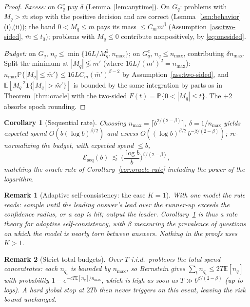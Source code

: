 \documentclass[11pt]{article}
\newtheorem{corollary}{Corollary}
\newtheorem{remark}{Remark}
\newcommand{\E}{\mathbb E}
\newcommand{\Pp}{\mathbb P}
\newcommand{\one}{\mathbf 1}
\newcommand{\nmax}{n_{\max}}
\begin{document}
\begin{proof}
\emph{Excess:} on $G_q^c$ pay $\delta$ (Lemma~\ref{lem:anytime}).  On $G_q$:
problems with $M_q>\bar m$ stop with the positive decision and are correct
(Lemma~\ref{lem:behavior}(i),(ii)); the band $0<M_q\le\bar m$ pays its mass
$\le C_m\bar m^\beta$ (Assumption~\ref{ass:two-sided}, $\bar m\le t_0$);
problems with $M_q\le0$ contribute nonpositively, by \eqref{eq:onesided}.

\emph{Budget:} on $G_q$, $n_q\le\min\{16L/M_q^2,\nmax\}$; on $G_q^c$,
$n_q\le\nmax$, contributing $\delta\nmax$.  Split the minimum at
$|M_q|\lessgtr\bar m'$ (where $16L/(\bar m')^2=\nmax$):
$\nmax\Pp\{|M_q|\le\bar m'\}\le16LC_m(\bar m')^{\beta-2}$ by
Assumption~\ref{ass:two-sided}, and
$\E[M_q^{-2}\one\{|M_q|>\bar m'\}]$ is bounded by the same integration by
parts as in Theorem~\ref{thm:oracle} with the two-sided
$F(t)=\Pp\{0<|M_q|\le t\}$.  The $+2$ absorbs epoch rounding.
\end{proof}

\begin{corollary}[Sequential rate]
\label{cor:seq-rate}
Choosing $\nmax=\lceil b^{2/(2-\beta)}\rceil$, $\delta=1/\nmax$ yields
expected spend $O(b(\log b)^{\beta/2})$ and excess
$O((\log b)^{\beta/2}\,b^{-\beta/(2-\beta)})$; re-normalizing the budget,
with expected spend $\le b$,
\[
\mathcal E_{\mathrm{seq}}(b)
\ \lesssim\
\Big(\frac{\log b}{b}\Big)^{\beta/(2-\beta)},
\]
matching the oracle rate of Corollary~\ref{cor:oracle-rate} including the
power of the logarithm.
\end{corollary}

\begin{remark}[Adaptive self-consistency: the case $K=1$]
\label{rem:selfconsistency}
With one model the rule reads: \emph{sample until the leading answer's lead
over the runner-up exceeds the confidence radius, or a cap is hit; output
the leader}.  Corollary~\ref{cor:seq-rate} is thus a rate theory for
adaptive self-consistency, with $\beta$ measuring the prevalence of
questions on which the model is nearly torn between answers.  Nothing in
the proofs uses $K>1$.
\end{remark}

\begin{remark}[Strict total budgets]
\label{rem:total-budget}
Over $T$ i.i.d.\ problems the total spend concentrates: each $n_{q_t}$ is
bounded by $\nmax$, so Bernstein gives
$\sum_tn_{q_t}\le2T\E[n_q]$ with probability
$1-e^{-cT\E[n_q]/\nmax}$, which is high as soon as
$T\gg b^{\beta/(2-\beta)}$ (up to logs).  A hard global stop at $2Tb$ then
never triggers on this event, leaving the risk bound unchanged.
\end{remark}
\end{document}
